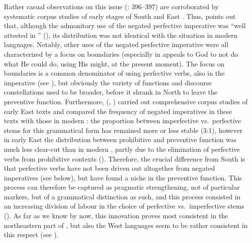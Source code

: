 \documentclass[output=paper,colorlinks,citecolor=brown]{langscibook}
\begin{document}
Rather casual observations on this issue (\citealt{Wiemer2008}: 396--397) are corroborated by systematic corpus studies of early stages of South and East . Thus, \citet{MacRobert2013} points out that, although the admonitory use of the negated perfective imperative was ``well attested in '' (\citeyear[286]{MacRobert2013}), its distribution was not identical with the situation in modern  languages. Notably, other uses of the negated perfective imperative were all characterized by a focus on boundaries (especially in appeals to God to not do what He could do, using His might, at the present moment). The focus on boundaries is a common denominator of using perfective verbs, also in the imperative (see ), but obviously the variety of functions and discourse constellations used to be broader, before it shrank in North  to leave the preventive function. Furthermore, \citeauthor{Mišina2020a} (\citeyear{Mišina2020b}, \citeyear{Mišina2020a}) carried out comprehensive corpus studies of early East  texts and compared the frequency of negated imperatives in these texts with those in modern : the proportion between imperfective vs.\ perfective stems for this grammatical form has remained more or less stable (3:1), however in early East  the distribution between prohibitive and preventive function was much less clear-cut than in modern , partly due to the elimination of perfective verbs from prohibitive contexts (\citeyear [172--176]{Mišina2020b}). Therefore, the crucial difference from South  is that perfective verbs have not been driven out altogether from negated imperatives (see below), but have found a niche in the preventive function. This process can therefore be captured as pragmatic strengthening, not of particular markers, but of a grammatical distinction as such, and this process consisted in an increasing division of labour in the choice of perfective vs.\ imperfective stems (). As far as we know by now, this innovation proves most consistent in the northeastern part of , but also the West  languages seem to be rather consistent in this respect (see ).
\end{document}

